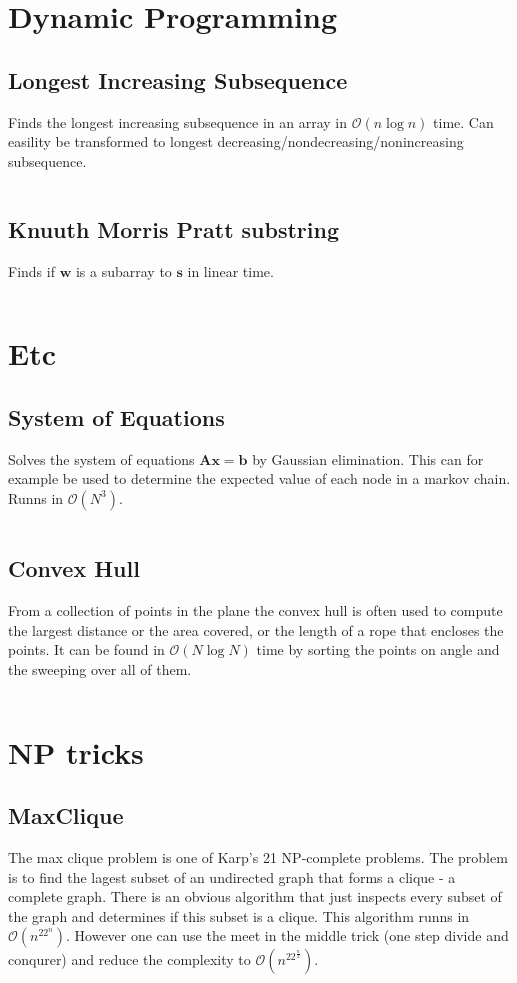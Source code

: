 \documentclass[8pt,a4paper,landscape,oneside]{amsart}
\newcommand{\code}[1]{\inputminted[fontsize=\normalsize,baselinestretch=1]{cpp}{code/#1}}
\newcommand{\bigO}{\mathcal{O}}
\begin{document}
\begin{multicols*}{3}
\section{Dynamic Programming}
    \subsection{Longest Increasing Subsequence}
        Finds the longest increasing subsequence in an array in $\bigO(n \log{n})$ time. Can easility be transformed to longest decreasing/nondecreasing/nonincreasing subsequence.
        \code{DP/lis.java}
    \subsection{Knuuth Morris Pratt substring}
        Finds if $\bm{w}$ is a subarray to $\bm{s}$ in linear time. 
        \code{DP/kmp.java}

\section{Etc}
    \subsection{System of Equations}
        Solves the system of equations $\bm{A}\bm{x} = \bm{b}$ by Gaussian elimination. This can for example be used to determine the expected value of each node in a markov chain. Runns in $\bigO (N^3)$.
        \code{Etc/SolveSystem.java}
    \subsection{Convex Hull}
        From a collection of points in the plane the convex hull is often used to compute the largest distance or the area covered, or the length of a rope that encloses the points. It can be found in $\bigO (N\log{N})$ time by sorting the points on angle and the sweeping over all of them.
        \code{Etc/ConvexHull.java}

\section{NP tricks}
    \subsection{MaxClique}
        The max clique problem is one of Karp's 21 NP-complete problems. The problem is to find the lagest subset of an undirected graph that forms a clique - a complete graph. There is an obvious algorithm that just inspects every subset of the graph and determines if this subset is a clique. This algorithm runns in $\bigO(n^22^n)$. However one can use the meet in the middle trick (one step divide and conqurer) and reduce the complexity to $\bigO(n^22^{\frac{n}{2}})$.
        \code{NP/MaxClique.java}

\end{multicols*}
\end{document}
